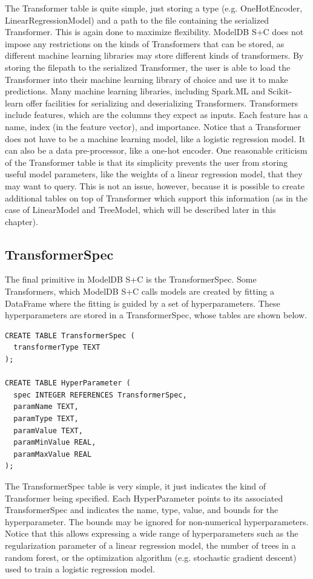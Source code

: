 The Transformer table is quite simple, just storing a type (e.g. OneHotEncoder,
LinearRegressionModel) and a path to the file containing the serialized Transformer.
This is again done to maximize flexibility. ModelDB S+C does not impose any restrictions
on the kinds of Transformers that can be stored, as different machine learning libraries
may store different kinds of transformers. By storing the filepath to the serialized Transformer,
the user is able to load the Transformer into their machine learning library of choice and use
it to make predictions. Many machine learning libraries, including Spark.ML and Scikit-learn offer
facilities for serializing and deserializing Transformers. Transformers include features, which are the
columns they expect as inputs. Each feature has a name, index (in the feature vector), and importance. 
Notice that a Transformer does not have to be a machine learning model, like a logistic regression model. 
It can also be a data pre-processor, like
a one-hot encoder. One reasonable criticism of the Transformer table is that its simplicity 
prevents the user from storing useful model parameters, like the weights of a linear regression model,
that they may want to query. This is not an issue, however, because it is possible to create
additional tables on top of Transformer which support this information (as in the case of LinearModel
and TreeModel, which will be described later in this chapter).

\subsection{TransformerSpec}
The final primitive in ModelDB S+C is the TransformerSpec. Some Transformers, which
ModelDB S+C calls models are created by fitting a DataFrame where the fitting is 
guided by a set of hyperparameters. These hyperparameters are stored in a 
TransformerSpec, whose tables are shown below.

\begin{verbatim}
CREATE TABLE TransformerSpec (
  transformerType TEXT
);

CREATE TABLE HyperParameter (
  spec INTEGER REFERENCES TransformerSpec,
  paramName TEXT,
  paramType TEXT,
  paramValue TEXT,
  paramMinValue REAL,
  paramMaxValue REAL
);
\end{verbatim}

The TransformerSpec table is very simple, it just indicates the kind of Transformer
being specified. Each HyperParameter points to its associated TransformerSpec and indicates
the name, type, value, and bounds for the hyperparameter. The bounds may be ignored
for non-numerical hyperparameters. Notice that this allows expressing a wide range
of hyperparameters such as the regularization parameter of a linear regression model, 
the number of trees in a random forest, or the optimization algorithm (e.g. stochastic 
gradient descent) used to train a logistic regression model.

